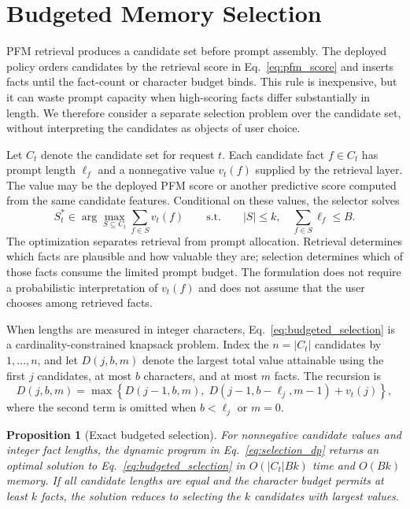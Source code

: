 \documentclass[letterpaper]{article} %
\newtheorem{proposition}{Proposition}
\begin{document}
\section{Budgeted Memory Selection}

PFM retrieval produces a candidate set before prompt assembly. The deployed policy orders candidates by the retrieval score in Eq.~\eqref{eq:pfm_score} and inserts facts until the fact-count or character budget binds. This rule is inexpensive, but it can waste prompt capacity when high-scoring facts differ substantially in length. We therefore consider a separate selection problem over the candidate set, without interpreting the candidates as objects of user choice.

Let $C_t$ denote the candidate set for request $t$. Each candidate fact $f\in C_t$ has prompt length $\ell_f$ and a nonnegative value $v_t(f)$ supplied by the retrieval layer. The value may be the deployed PFM score or another predictive score computed from the same candidate features. Conditional on these values, the selector solves
\begin{equation}
S_t^*\in\arg\max_{S\subseteq C_t}\sum_{f\in S}v_t(f)\qquad\text{s.t.}\qquad |S|\le k,\quad \sum_{f\in S}\ell_f\le B.
\label{eq:budgeted_selection}
\end{equation}
The optimization separates retrieval from prompt allocation. Retrieval determines which facts are plausible and how valuable they are; selection determines which of those facts consume the limited prompt budget. The formulation does not require a probabilistic interpretation of $v_t(f)$ and does not assume that the user chooses among retrieved facts.

When lengths are measured in integer characters, Eq.~\eqref{eq:budgeted_selection} is a cardinality-constrained knapsack problem. Index the $n=|C_t|$ candidates by $1,\ldots,n$, and let $D(j,b,m)$ denote the largest total value attainable using the first $j$ candidates, at most $b$ characters, and at most $m$ facts. The recursion is
\begin{equation}
D(j,b,m)=\max\left\{D(j-1,b,m),\;D(j-1,b-\ell_j,m-1)+v_t(j)\right\},
\label{eq:selection_dp}
\end{equation}
where the second term is omitted when $b<\ell_j$ or $m=0$.

\begin{proposition}[Exact budgeted selection]
\label{prop:budgeted_selection}
For nonnegative candidate values and integer fact lengths, the dynamic program in Eq.~\eqref{eq:selection_dp} returns an optimal solution to Eq.~\eqref{eq:budgeted_selection} in $O(|C_t|Bk)$ time and $O(Bk)$ memory. If all candidate lengths are equal and the character budget permits at least $k$ facts, the solution reduces to selecting the $k$ candidates with largest values.
\end{proposition}
\end{document}
